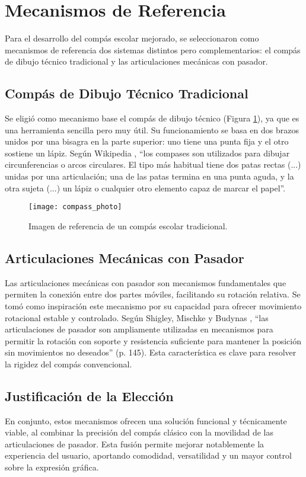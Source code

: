 \documentclass[11pt, a4paper]{article}
\begin{document}
\section{Mecanismos de Referencia}
\label{sec:referencias}
Para el desarrollo del compás escolar mejorado, se seleccionaron como mecanismos de referencia dos sistemas distintos pero complementarios: el compás de dibujo técnico tradicional y las articulaciones mecánicas con pasador.

\subsection{Compás de Dibujo Técnico Tradicional}
Se eligió como mecanismo base el compás de dibujo técnico (Figura \ref{fig:ref_compas}), ya que es una herramienta sencilla pero muy útil. Su funcionamiento se basa en dos brazos unidos por una bisagra en la parte superior: uno tiene una punta fija y el otro sostiene un lápiz.
Según Wikipedia \cite{wikipedia_utensilios}, “los compases son utilizados para dibujar circunferencias o arcos circulares. El tipo más habitual tiene dos patas rectas (...) unidas por una articulación; una de las patas termina en una punta aguda, y la otra sujeta (...) un lápiz o cualquier otro elemento capaz de marcar el papel”.

\begin{figure}[H]
    \centering
    \texttt{[image: compass\_photo]}
    \caption{Imagen de referencia de un compás escolar tradicional.}
    \label{fig:ref_compas}
\end{figure}

\subsection{Articulaciones Mecánicas con Pasador}
Las articulaciones mecánicas con pasador son mecanismos fundamentales que permiten la conexión entre dos partes móviles, facilitando su rotación relativa. Se tomó como inspiración este mecanismo por su capacidad para ofrecer movimiento rotacional estable y controlado.
Según Shigley, Mischke y Budynas \cite{shigley_design}, “las articulaciones de pasador son ampliamente utilizadas en mecanismos para permitir la rotación con soporte y resistencia suficiente para mantener la posición sin movimientos no deseados” (p. 145). Esta característica es clave para resolver la rigidez del compás convencional.

\subsection{Justificación de la Elección}
En conjunto, estos mecanismos ofrecen una solución funcional y técnicamente viable, al combinar la precisión del compás clásico con la movilidad de las articulaciones de pasador. Esta fusión permite mejorar notablemente la experiencia del usuario, aportando comodidad, versatilidad y un mayor control sobre la expresión gráfica.
\newpage
\end{document}
